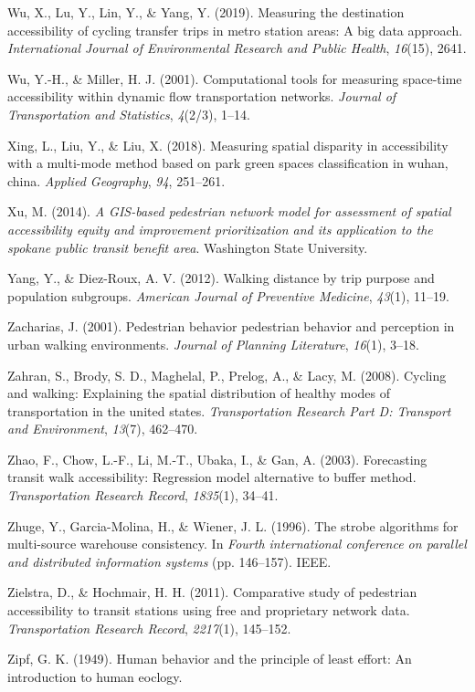 \documentclass[
11pt, %
oneside, %
english, %
singlespacing, %
]{macthesis} %
\newlength{\cslhangindent}
\newenvironment{CSLReferences}[2] %
{\begin{list}{}{%
	\setlength{\itemindent}{0pt}
	\setlength{\leftmargin}{0pt}
	\setlength{\parsep}{0pt}
	\ifodd #1
	\setlength{\leftmargin}{\cslhangindent}
	\setlength{\itemindent}{-1\cslhangindent}
	\fi
	\setlength{\itemsep}{#2\baselineskip}}}
{\end{list}}
\begin{document}
\begin{CSLReferences}{1}{0}
Wu, X., Lu, Y., Lin, Y., \& Yang, Y. (2019). Measuring the destination accessibility of cycling transfer trips in metro station areas: A big data approach. \emph{International Journal of Environmental Research and Public Health}, \emph{16}(15), 2641.

Wu, Y.-H., \& Miller, H. J. (2001). Computational tools for measuring space-time accessibility within dynamic flow transportation networks. \emph{Journal of Transportation and Statistics}, \emph{4}(2/3), 1--14.

Xing, L., Liu, Y., \& Liu, X. (2018). Measuring spatial disparity in accessibility with a multi-mode method based on park green spaces classification in wuhan, china. \emph{Applied Geography}, \emph{94}, 251--261.

Xu, M. (2014). \emph{A GIS-based pedestrian network model for assessment of spatial accessibility equity and improvement prioritization and its application to the spokane public transit benefit area}. Washington State University.

Yang, Y., \& Diez-Roux, A. V. (2012). Walking distance by trip purpose and population subgroups. \emph{American Journal of Preventive Medicine}, \emph{43}(1), 11--19.

Zacharias, J. (2001). Pedestrian behavior pedestrian behavior and perception in urban walking environments. \emph{Journal of Planning Literature}, \emph{16}(1), 3--18.

Zahran, S., Brody, S. D., Maghelal, P., Prelog, A., \& Lacy, M. (2008). Cycling and walking: Explaining the spatial distribution of healthy modes of transportation in the united states. \emph{Transportation Research Part D: Transport and Environment}, \emph{13}(7), 462--470.

Zhao, F., Chow, L.-F., Li, M.-T., Ubaka, I., \& Gan, A. (2003). Forecasting transit walk accessibility: Regression model alternative to buffer method. \emph{Transportation Research Record}, \emph{1835}(1), 34--41.

Zhuge, Y., Garcia-Molina, H., \& Wiener, J. L. (1996). The strobe algorithms for multi-source warehouse consistency. In \emph{Fourth international conference on parallel and distributed information systems} (pp. 146--157). IEEE.

Zielstra, D., \& Hochmair, H. H. (2011). Comparative study of pedestrian accessibility to transit stations using free and proprietary network data. \emph{Transportation Research Record}, \emph{2217}(1), 145--152.

Zipf, G. K. (1949). Human behavior and the principle of least effort: An introduction to human eoclogy.

\end{CSLReferences}
\end{document}
